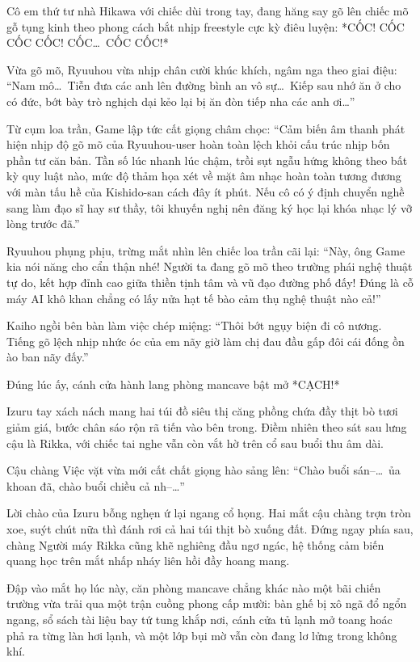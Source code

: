\documentclass[../main.tex]{subfiles}
\begin{document}
Cô em thứ tư nhà Hikawa với chiếc dùi trong tay, đang hăng say gõ lên chiếc mõ gỗ tụng kinh theo phong cách bắt nhịp freestyle cực kỳ điêu luyện: *CỐC! CỐC CỐC CỐC! CỐC\dots\ CỐC CỐC!*

Vừa gõ mõ, Ryuuhou vừa nhịp chân cười khúc khích, ngâm nga theo giai điệu: ``Nam mô\dots\ Tiễn đưa các anh lên đường bình an vô sự\dots\ Kiếp sau nhớ ăn ở cho có đức, bớt bày trò nghịch dại kẻo lại bị ăn đòn tiếp nha các anh ơi\dots''

Từ cụm loa trần, Game lập tức cất giọng châm chọc: ``Cảm biến âm thanh phát hiện nhịp độ gõ mõ của Ryuuhou-user hoàn toàn lệch khỏi cấu trúc nhịp bốn phần tư căn bản. Tần số lúc nhanh lúc chậm, trồi sụt ngẫu hứng không theo bất kỳ quy luật nào, mức độ thảm họa xét về mặt âm nhạc hoàn toàn tương đương với màn tấu hề của Kishido-san cách đây ít phút. Nếu cô có ý định chuyển nghề sang làm đạo sĩ hay sư thầy, tôi khuyến nghị nên đăng ký học lại khóa nhạc lý vỡ lòng trước đã.''

Ryuuhou phụng phịu, trừng mắt nhìn lên chiếc loa trần cãi lại: ``Này, ông Game kia nói năng cho cẩn thận nhé! Người ta đang gõ mõ theo trường phái nghệ thuật tự do, kết hợp đỉnh cao giữa thiền tịnh tâm và vũ đạo đường phố đấy! Đúng là cỗ máy AI khô khan chẳng có lấy nửa hạt tế bào cảm thụ nghệ thuật nào cả!''

Kaiho ngồi bên bàn làm việc chép miệng: ``Thôi bớt ngụy biện đi cô nương. Tiếng gõ lệch nhịp nhức óc của em nãy giờ làm chị đau đầu gấp đôi cái đống ồn ào ban nãy đấy.''

Đúng lúc ấy, cánh cửa hành lang phòng mancave bật mở *CẠCH!*

Izuru tay xách nách mang hai túi đồ siêu thị căng phồng chứa đầy thịt bò tươi giảm giá, bước chân sáo rộn rã tiến vào bên trong. Điềm nhiên theo sát sau lưng cậu là Rikka, với chiếc tai nghe vẫn còn vắt hờ trên cổ sau buổi thu âm dài.


Cậu chàng Việc vặt vừa mới cất chất giọng hào sảng lên: ``Chào buổi sán--\dots\ ủa khoan đã, chào buổi chiều cả nh--\dots''

Lời chào của Izuru bỗng nghẹn ứ lại ngang cổ họng. Hai mắt cậu chàng trợn tròn xoe, suýt chút nữa thì đánh rơi cả hai túi thịt bò xuống đất. Đứng ngay phía sau, chàng Người máy Rikka cũng khẽ nghiêng đầu ngơ ngác, hệ thống cảm biến quang học trên mắt nhấp nháy liên hồi đầy hoang mang.

Đập vào mắt họ lúc này, căn phòng mancave chẳng khác nào một bãi chiến trường vừa trải qua một trận cuồng phong cấp mười: bàn ghế bị xô ngã đổ ngổn ngang, sổ sách tài liệu bay tứ tung khắp nơi, cánh cửa tủ lạnh mở toang hoác phả ra từng làn hơi lạnh, và một lớp bụi mờ vẫn còn đang lơ lửng trong không khí.
\end{document}

